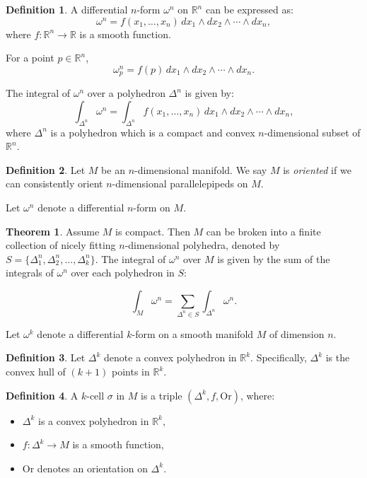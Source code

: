 \documentclass[11pt]{article}
\theoremstyle{definition}
\newtheorem{definition}{Definition}[section]
\newtheorem{theorem}{Theorem}[section]
\theoremstyle{remark}
\begin{document}
\begin{definition}\label{def:n-form}
    A differential $n$-form $\omega^n$ on $\mathbb{R}^n$ can be expressed as:
    \[
    \omega^n = f(x_1, \ldots, x_n) \, dx_1 \wedge dx_2 \wedge \cdots \wedge dx_n,
    \]
    where $f: \mathbb{R}^n \to \mathbb{R}$ is a smooth function.
\end{definition}

For a point $p \in \mathbb{R}^n$,
\[
\omega^n_p = f(p) \, dx_1 \wedge dx_2 \wedge \cdots \wedge dx_n.
\]

The integral of $\omega^n$ over a polyhedron $\Delta^n$ is given by:
\[
\int_{\Delta^n} \omega^n = \int_{\Delta^n} f(x_1, \ldots, x_n) \, dx_1 \wedge dx_2 \wedge \cdots \wedge dx_n,
\]
where $\Delta^n$ is a polyhedron which is a compact and convex $n$-dimensional subset of $\mathbb{R}^n$.

\begin{definition}\label{def:oriented_manifold}
Let $M$ be an $n$-dimensional manifold. We say $M$ is \emph{oriented} if we can consistently orient $n$-dimensional parallelepipeds on $M$.
\end{definition}

Let $\omega^n$ denote a differential $n$-form on $M$.

\begin{theorem}\label{thm:integration_on_compact_manifold}
Assume $M$ is compact. Then $M$ can be broken into a finite collection of nicely fitting $n$-dimensional polyhedra, denoted by $S = \{ \Delta^n_1, \Delta^n_2, \dots, \Delta^n_k \}$. The integral of $\omega^n$ over $M$ is given by the sum of the integrals of $\omega^n$ over each polyhedron in $S$:

\[
\int_M \omega^n = \sum_{\Delta^n \in S} \int_{\Delta^n} \omega^n.
\]
\end{theorem}

Let $\omega^k$ denote a differential $k$-form on a smooth manifold $M$ of dimension $n$.

\begin{definition}\label{def:convex-polyhedron}
Let $\Delta^k$ denote a convex polyhedron in $\mathbb{R}^k$. Specifically, $\Delta^k$ is the convex hull of $(k+1)$ points in $\mathbb{R}^k$.
\end{definition}

\begin{definition}\label{def:k-cell}
A $k$-cell $\sigma$ in $M$ is a triple $(\Delta^k, f, \text{Or})$, where:
\begin{itemize}
    \item $\Delta^k$ is a convex polyhedron in $\mathbb{R}^k$,
    \item $f: \Delta^k \to M$ is a smooth function,
    \item $\text{Or}$ denotes an orientation on $\Delta^k$.
\end{itemize}
\end{definition}
\end{document}
